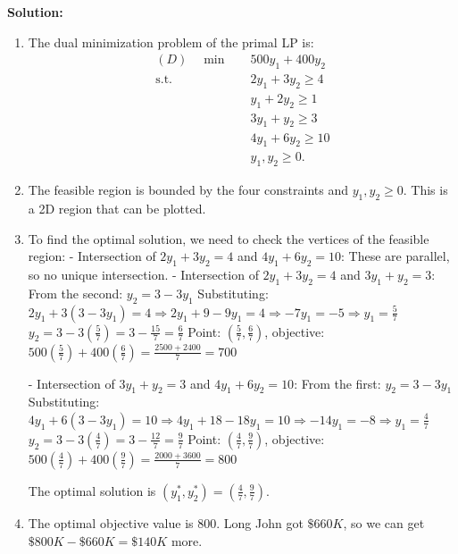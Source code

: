 \documentclass[11pt]{article}
\begin{document}
\begin{enumerate}
    \textbf{Solution:}
    
    \begin{enumerate}
        \item The dual minimization problem of the primal LP is:
              \begin{align*}
              (D)\quad\min \quad & 500y_1 + 400y_2 \\
              \text{s.t.}\quad & 2y_1 + 3y_2 \ge 4 \\
              & y_1 + 2y_2 \ge 1 \\
              & 3y_1 + y_2 \ge 3 \\
              & 4y_1 + 6y_2 \ge 10 \\
              & y_1, y_2 \ge 0.
              \end{align*}

        \item The feasible region is bounded by the four constraints and $y_1, y_2 \ge 0$. This is a 2D region that can be plotted.

        \item To find the optimal solution, we need to check the vertices of the feasible region:
              - Intersection of $2y_1 + 3y_2 = 4$ and $4y_1 + 6y_2 = 10$: These are parallel, so no unique intersection.
              - Intersection of $2y_1 + 3y_2 = 4$ and $3y_1 + y_2 = 3$: 
                From the second: $y_2 = 3 - 3y_1$
                Substituting: $2y_1 + 3(3 - 3y_1) = 4 \Rightarrow 2y_1 + 9 - 9y_1 = 4 \Rightarrow -7y_1 = -5 \Rightarrow y_1 = \frac{5}{7}$
                $y_2 = 3 - 3(\frac{5}{7}) = 3 - \frac{15}{7} = \frac{6}{7}$
                Point: $(\frac{5}{7}, \frac{6}{7})$, objective: $500(\frac{5}{7}) + 400(\frac{6}{7}) = \frac{2500 + 2400}{7} = 700$
              
              - Intersection of $3y_1 + y_2 = 3$ and $4y_1 + 6y_2 = 10$:
                From the first: $y_2 = 3 - 3y_1$
                Substituting: $4y_1 + 6(3 - 3y_1) = 10 \Rightarrow 4y_1 + 18 - 18y_1 = 10 \Rightarrow -14y_1 = -8 \Rightarrow y_1 = \frac{4}{7}$
                $y_2 = 3 - 3(\frac{4}{7}) = 3 - \frac{12}{7} = \frac{9}{7}$
                Point: $(\frac{4}{7}, \frac{9}{7})$, objective: $500(\frac{4}{7}) + 400(\frac{9}{7}) = \frac{2000 + 3600}{7} = 800$

              The optimal solution is $(y_1^*, y_2^*) = (\frac{4}{7}, \frac{9}{7})$.

        \item The optimal objective value is $800$. Long John got $\$660K$, so we can get $\$800K - \$660K = \$140K$ more.


\end{enumerate}
\end{enumerate}
\end{document}
